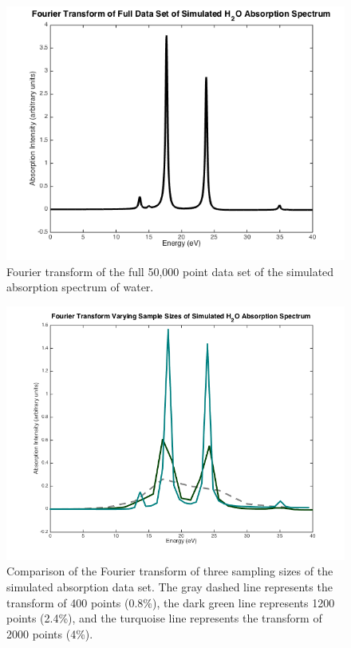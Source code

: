 \documentclass[11pt]{article}
\begin{document}
\begin{figure}[H]
\includegraphics[scale = 0.8]{ftoffulldata.png}
\caption{Fourier transform of the full 50,000 point data set of the simulated absorption spectrum of water.}
\label{fig:fullFT}
\end{figure}

\begin{figure}[H]
\includegraphics[scale = 0.6]{FT_comp.png}
\caption{Comparison of the Fourier transform of three sampling sizes of the simulated absorption data set. The gray dashed line represents the transform of 400 points (0.8\%), the dark green line represents 1200 points (2.4\%), and the turquoise line represents the transform of 2000 points (4\%).}
\label{fig:FTcomp}
\end{figure}
\end{document}
